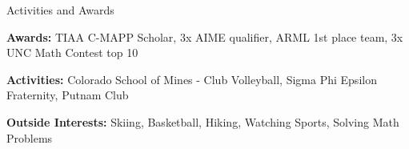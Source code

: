 \documentclass{resume} %
\begin{document}
\vspace{-6pt}



\begin{rSection}{Activities and Awards} 

\textbf{Awards:} TIAA C-MAPP Scholar, 3x AIME qualifier, ARML 1st place team, 3x UNC Math Contest top 10
\vspace{-4pt}

\textbf{Activities:} Colorado School of Mines - Club Volleyball, Sigma Phi Epsilon Fraternity, Putnam Club
\vspace{-4pt}

\textbf{Outside Interests:} Skiing, Basketball, Hiking, Watching Sports, Solving Math Problems


 

\end{rSection}
\end{document}
